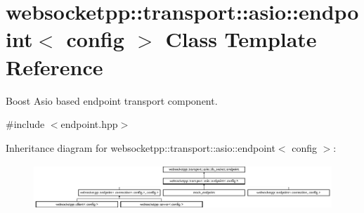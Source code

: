 \hypertarget{classwebsocketpp_1_1transport_1_1asio_1_1endpoint}{}\section{websocketpp\+:\+:transport\+:\+:asio\+:\+:endpoint$<$ config $>$ Class Template Reference}
\label{classwebsocketpp_1_1transport_1_1asio_1_1endpoint}


Boost Asio based endpoint transport component.  




{\ttfamily \#include $<$endpoint.\+hpp$>$}

Inheritance diagram for websocketpp\+:\+:transport\+:\+:asio\+:\+:endpoint$<$ config $>$\+:\begin{figure}[H]
\begin{center}
\leavevmode
\includegraphics[height=1.666667cm]{classwebsocketpp_1_1transport_1_1asio_1_1endpoint}
\end{center}
\end{figure}
